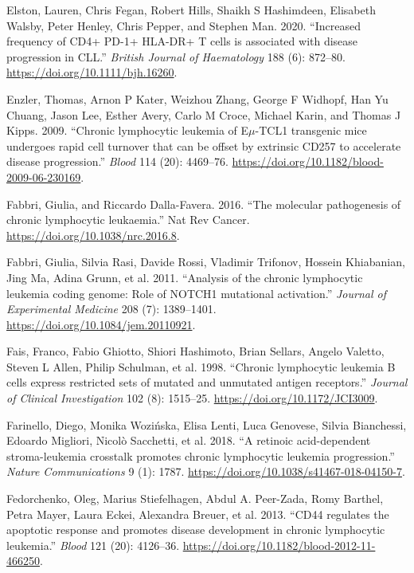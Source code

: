 \documentclass[11pt, a4paper, twosided]{book}
\newenvironment{CSLReferences}%
  {}%
  {\par}
\begin{document}
\begin{CSLReferences}{1}{0}
\leavevmode{}%
Elston, Lauren, Chris Fegan, Robert Hills, Shaikh S Hashimdeen, Elisabeth Walsby, Peter Henley, Chris Pepper, and Stephen Man. 2020. {``{Increased frequency of CD4+ PD-1+ HLA-DR+ T cells is associated with disease progression in CLL.}''} \emph{British Journal of Haematology} 188 (6): 872--80. \url{https://doi.org/10.1111/bjh.16260}.

\leavevmode{}%
Enzler, Thomas, Arnon P Kater, Weizhou Zhang, George F Widhopf, Han Yu Chuang, Jason Lee, Esther Avery, Carlo M Croce, Michael Karin, and Thomas J Kipps. 2009. {``{Chronic lymphocytic leukemia of E\(\mu\)-TCL1 transgenic mice undergoes rapid cell turnover that can be offset by extrinsic CD257 to accelerate disease progression}.''} \emph{Blood} 114 (20): 4469--76. \url{https://doi.org/10.1182/blood-2009-06-230169}.

\leavevmode{}%
Fabbri, Giulia, and Riccardo Dalla-Favera. 2016. {``{The molecular pathogenesis of chronic lymphocytic leukaemia}.''} Nat Rev Cancer. \url{https://doi.org/10.1038/nrc.2016.8}.

\leavevmode{}%
Fabbri, Giulia, Silvia Rasi, Davide Rossi, Vladimir Trifonov, Hossein Khiabanian, Jing Ma, Adina Grunn, et al. 2011. {``{Analysis of the chronic lymphocytic leukemia coding genome: Role of NOTCH1 mutational activation}.''} \emph{Journal of Experimental Medicine} 208 (7): 1389--1401. \url{https://doi.org/10.1084/jem.20110921}.

\leavevmode{}%
Fais, Franco, Fabio Ghiotto, Shiori Hashimoto, Brian Sellars, Angelo Valetto, Steven L Allen, Philip Schulman, et al. 1998. {``{Chronic lymphocytic leukemia B cells express restricted sets of mutated and unmutated antigen receptors}.''} \emph{Journal of Clinical Investigation} 102 (8): 1515--25. \url{https://doi.org/10.1172/JCI3009}.

\leavevmode{}%
Farinello, Diego, Monika Wozińska, Elisa Lenti, Luca Genovese, Silvia Bianchessi, Edoardo Migliori, Nicolò Sacchetti, et al. 2018. {``{A retinoic acid-dependent stroma-leukemia crosstalk promotes chronic lymphocytic leukemia progression}.''} \emph{Nature Communications} 9 (1): 1787. \url{https://doi.org/10.1038/s41467-018-04150-7}.

\leavevmode{}%
Fedorchenko, Oleg, Marius Stiefelhagen, Abdul A. Peer-Zada, Romy Barthel, Petra Mayer, Laura Eckei, Alexandra Breuer, et al. 2013. {``{CD44 regulates the apoptotic response and promotes disease development in chronic lymphocytic leukemia}.''} \emph{Blood} 121 (20): 4126--36. \url{https://doi.org/10.1182/blood-2012-11-466250}.


\end{CSLReferences}
\end{document}
